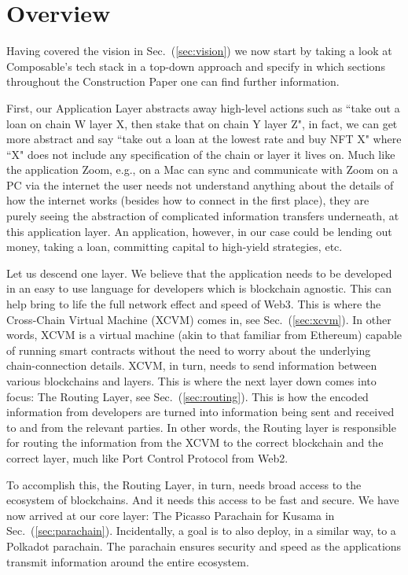 \section{Overview}

Having covered the vision in Sec.~(\ref{sec:vision}) we now start by taking a look at Composable's tech stack in a top-down approach and specify in which sections throughout the Construction Paper one can find further information.

First, our Application Layer abstracts away high-level actions such as ``take out a loan on chain W layer X, then stake that on chain Y layer Z", in fact, we can get more abstract and say ``take out a loan at the lowest rate and buy NFT X" where ``X" does not include any specification of the chain or layer it lives on.
%
Much like the application Zoom, e.g., on a Mac can sync and communicate with Zoom on a PC via the internet the user needs not understand anything about the details of how the internet works (besides how to connect in the first place), they are purely seeing the abstraction of complicated information transfers underneath, at this application layer.
%
An application, however, in our case could be lending out money, taking a loan, committing capital to high-yield strategies, etc.

Let us descend one layer. We believe that the application needs to be developed in an easy to use language for developers which is blockchain agnostic. This can help bring to life the full network effect and speed of Web3.
%
This is where the Cross-Chain Virtual Machine (XCVM) comes in, see Sec.~(\ref{sec:xcvm}). In other words, XCVM is a virtual machine (akin to that familiar from Ethereum) capable of running smart contracts without the need to worry about the underlying chain-connection details.
%
XCVM, in turn, needs to send information between various blockchains and layers.
%
This is where the next layer down comes into focus: The Routing Layer, see Sec.~(\ref{sec:routing}). This is how the encoded information from developers are turned into information being sent and received to and from the relevant parties.
%
In other words, the Routing layer is responsible for routing the information from the XCVM to the correct blockchain and the correct layer, much like Port Control Protocol \cite{PortWikipedia} from Web2.

To accomplish this, the Routing Layer, in turn, needs broad access to the ecosystem of blockchains. And it needs this access to be fast and secure.
%
We have now arrived at our core layer: The Picasso Parachain for Kusama in Sec.~(\ref{sec:parachain}).
%
Incidentally, a goal is to also deploy, in a similar way, to a Polkadot parachain.
%
The parachain ensures security and speed as the applications transmit information around the entire ecosystem.


